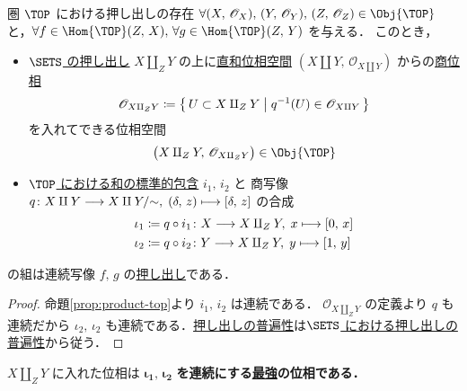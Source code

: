 \documentclass[geometry_main]{subfiles}
\begin{document}
\begin{myprop}[label=prop:pushout-top]{圏 $\TOP$ における押し出しの存在}
	$\forall (X,\, \mathscr{O}_X),\, (Y,\, \mathscr{O}_Y),\, \phase{Z} \in \Obj{\TOP}$ と，$\forall f \in \Hom{\TOP}(Z,\, X),\, \forall g \in \Hom{\TOP}(Z,\, Y)$ を与える．
	このとき，
	\begin{itemize}
		\item \hyperref[prop:pushout-sets]{$\SETS$ の押し出し} $X \amalg_Z Y$ の上に\hyperref[prop:sum-top]{直和位相空間} $(X \amalg Y,\, \mathscr{O}_{X \amalg Y})$ からの\hyperref[quotopo]{商位相}
		\begin{align}
			\mathscr{O}_{X \amalg_Z Y} \coloneqq \bigl\{\, U \subset X \amalg_Z Y \bigm| q^{-1}(U) \in \mathscr{O}_{X \amalg Y} \,\bigr\} 
		\end{align}
		を入れてできる位相空間
		\begin{align}
			\bigl( X \amalg_Z Y,\, \mathscr{O}_{X \amalg_Z Y} \bigr) \in \Obj{\TOP}
		\end{align}
		\item \hyperref[prop:sum-top]{$\TOP$ における和の標準的包含} $i_1,\, i_2$ と
		商写像 $q \colon X \amalg Y \longrightarrow X \amalg Y/{\sim},\; (\delta,\, z) \longmapsto [\delta,\, z]$ の合成
		\begin{align}
			\iota_1 &\coloneqq q \circ i_1 \colon X \longrightarrow X \amalg_Z Y,\; x \longmapsto [0,\, x] \\
			\iota_2 &\coloneqq q \circ i_2 \colon Y \longrightarrow X \amalg_Z Y,\; y \longmapsto [1,\, y]
		\end{align}
	\end{itemize}
	の組は連続写像 $f,\, g$ の\hyperref[def:pushout]{押し出し}である．
\end{myprop}

\begin{proof}
	命題\ref{prop:product-top}より $i_1,\, i_2$ は連続である．
	$\mathscr{O}_{X \amalg_Z Y}$ の定義より $q$ も連続だから
	$\iota_2,\, \iota_2$ も連続である．\hyperref[cmtd:pushout]{押し出しの普遍性}は\hyperref[prop:pushout-sets]{$\SETS$ における押し出しの普遍性}から従う．
\end{proof}

\begin{marker}\label{remark:pushout}
	$X \amalg_Z Y$ に入れた位相は $\bm{\iota_1},\, \bm{\iota_2}$ \textbf{を連続にする\hyperref[def.intensity_topo]{最強}の位相である．}
\end{marker}

\end{document}
